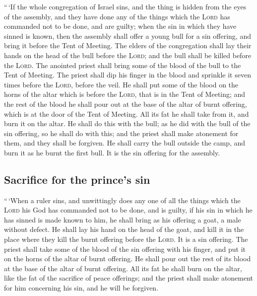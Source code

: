  ``\,`If the whole congregation of Israel sins, and the
thing is hidden from the eyes of the assembly, and they have done any of
the things which the \textsc{Lord} has commanded not to be done, and are
guilty;  when the sin in which they have sinned is known,
then the assembly shall offer a young bull for a sin offering, and bring
it before the Tent of Meeting.  The elders of the
congregation shall lay their hands on the head of the bull before the
\textsc{Lord}; and the bull shall be killed before the \textsc{Lord}.
 The anointed priest shall bring some of the blood of the
bull to the Tent of Meeting.  The priest shall dip his
finger in the blood and sprinkle it seven times before the
\textsc{Lord}, before the veil.  He shall put some of the
blood on the horns of the altar which is before the \textsc{Lord}, that
is in the Tent of Meeting; and the rest of the blood he shall pour out
at the base of the altar of burnt offering, which is at the door of the
Tent of Meeting.  All its fat he shall take from it, and
burn it on the altar.  He shall do this with the bull; as
he did with the bull of the sin offering, so he shall do with this; and
the priest shall make atonement for them, and they shall be forgiven.
 He shall carry the bull outside the camp, and burn it as
he burnt the first bull. It is the sin offering for the assembly.

\hypertarget{sacrifice-for-the-princes-sin}{%
\subsection{Sacrifice for the prince's
sin}\label{sacrifice-for-the-princes-sin}}

 ``\,`When a ruler sins, and unwittingly does any one of
all the things which the \textsc{Lord} his God has commanded not to be
done, and is guilty,  if his sin in which he has sinned
is made known to him, he shall bring as his offering a goat, a male
without defect.  He shall lay his hand on the head of the
goat, and kill it in the place where they kill the burnt offering before
the \textsc{Lord}. It is a sin offering.  The priest
shall take some of the blood of the sin offering with his finger, and
put it on the horns of the altar of burnt offering. He shall pour out
the rest of its blood at the base of the altar of burnt offering.
 All its fat he shall burn on the altar, like the fat of
the sacrifice of peace offerings; and the priest shall make atonement
for him concerning his sin, and he will be forgiven.

